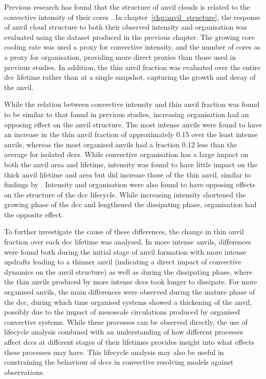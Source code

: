 
Previous research has found that the structure of anvil clouds is related to the convective intensity of their cores \citep{protopapadaki_upper_2017, takahashi_relationships_2017}.
In chapter~\ref{chp:anvil_structure}, the response of anvil cloud structure to both their observed intensity and organisation was evaluated using the dataset produced in the previous chapter.
The growing core cooling rate was used a proxy for convective intensity, and the number of cores as a proxy for organisation, providing more direct proxies than those used in previous studies.
In addition, the thin anvil fraction was evaluated over the entire \acrshort{dcc} lifetime rather than at a single snapshot, capturing the growth and decay of the anvil.

While the relation between convective intensity and thin anvil fraction was found to be similar to that found in previous studies, increasing organisation had an opposing effect on the anvil structure.
The most intense anvils were found to have an increase in the thin anvil fraction of approximately 0.15 over the least intense anvils, whereas the most organised anvils had a fraction 0.12 less than the average for isolated \acrshort{dcc}s.
While convective organisation has a large impact on both the anvil area and lifetime, intensity was found to have little impact on the thick anvil lifetime and area but did increase those of the thin anvil, similar to findings by \citet{sokol_greater_2024}.
Intensity and organisation were also found to have opposing effects on the structure of the \acrshort{dcc} lifecycle.
While increasing intensity shortened the growing phase of the \acrshort{dcc} and lengthened the dissipating phase, organisation had the opposite effect.

To further investigate the cause of these differences, the change in thin anvil fraction over each \acrshort{dcc} lifetime was analysed.
In more intense anvils, differences were found both during the initial stage of anvil formation with more intense updrafts leading to a thinner anvil (indicating a direct impact of convective dynamics on the anvil structure) as well as during the dissipating phase, where the thin anvils produced by more intense \acrshort{dcc}s took longer to dissipate.
For more organised anvils, the main differences were observed during the mature phase of the \acrshort{dcc}, during which time organised systems showed a thickening of the anvil, possibly due to the impact of mesoscale circulations produced by organised convective systems.
While these processes can be observed directly, the use of lifecycle analysis combined with an understanding of how different processes affect \acrshort{dcc}s at different stages of their lifetimes provides insight into what effects these processes may have.
This lifecycle analysis may also be useful in constraining the behaviour of \acrshort{dcc}s in convective resolving models against observations.

